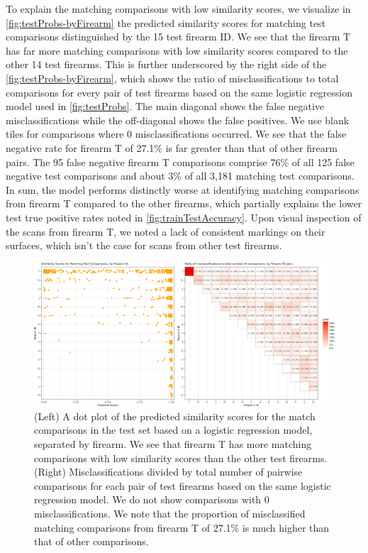 \documentclass[reprint]{JASA}
\begin{document}
To explain the matching comparisons with low similarity scores, we
visualize in \autoref{fig:testProbs-byFirearm} the predicted similarity
scores for matching test comparisons distinguished by the 15 test
firearm ID. We see that the firearm T has far more matching comparisons
with low similarity scores compared to the other 14 test firearms. This
is further underscored by the right side of the
\autoref{fig:testProbs-byFirearm}, which shows the ratio of
misclassifications to total comparisons for every pair of test firearms
based on the same logistic regression model used in
\autoref{fig:testProbs}. The main diagonal shows the false negative
misclassifications while the off-diagonal shows the false positives. We
use blank tiles for comparisons where 0 misclassifications occurred. We
see that the false negative rate for firearm T of 27.1\% is far greater
than that of other firearm pairs. The 95 false negative firearm T
comparisons comprise 76\% of all 125 false negative test comparisons and
about 3\% of all 3,181 matching test comparisons. In sum, the model
performs distinctly worse at identifying matching comparisons from
firearm T compared to the other firearms, which partially explains the
lower test true positive rates noted in \autoref{fig:trainTestAccuracy}.
Upon visual inspection of the scans from firearm T, we noted a lack of
consistent markings on their surfaces, which isn't the case for scans
from other test firearms.

\begin{figure}[htbp]

{\centering \includegraphics[width=\textwidth]{images/resultsPlots/misclassifPlt} 

}

\caption{\label{fig:testProbs-byFirearm} (Left) A dot plot of the predicted similarity scores for the match comparisons in the test set based on a logistic regression model, separated by firearm. We see that firearm T has more matching comparisons with low similarity scores than the other test firearms. (Right) Misclassifications divided by total number of pairwise comparisons for each pair of test firearms based on the same logistic regression model. We do not show comparisons with 0 misclassifications. We note that the proportion of misclassified matching comparisons from firearm T of 27.1\% is much higher than that of other comparisons.}\label{fig:unnamed-chunk-11}
\end{figure}
\end{document}
